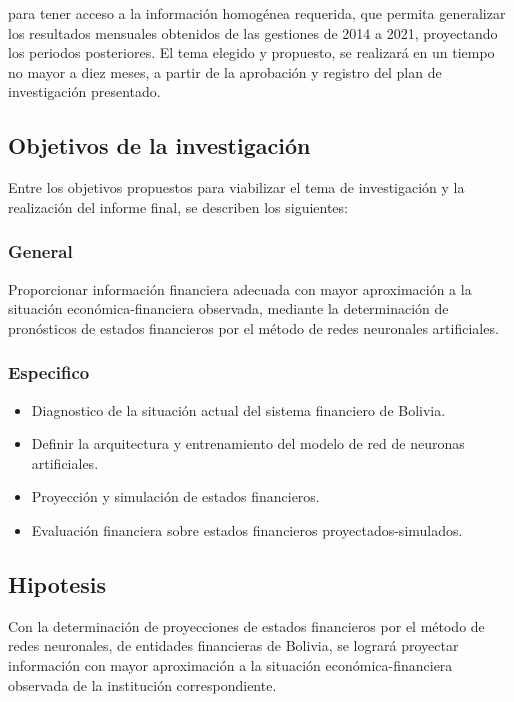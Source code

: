 \documentclass[
  12pt,
]{article}
\providecommand{\tightlist}{%
  \setlength{\itemsep}{0pt}\setlength{\parskip}{0pt}}
\begin{document}
para tener acceso a la información homogénea requerida, que permita
generalizar los resultados mensuales obtenidos de las gestiones de 2014
a 2021, proyectando los periodos posteriores. El tema elegido y
propuesto, se realizará en un tiempo no mayor a diez meses, a partir de
la aprobación y registro del plan de investigación presentado.

\hypertarget{objetivos-de-la-investigaciuxf3n}{%
\subsection{Objetivos de la
investigación}\label{objetivos-de-la-investigaciuxf3n}}

Entre los objetivos propuestos para viabilizar el tema de investigación
y la realización del informe final, se describen los siguientes:

\hypertarget{general}{%
\subsubsection{General}\label{general}}

Proporcionar información financiera adecuada con mayor aproximación a la
situación económica-financiera observada, mediante la determinación de
pronósticos de estados financieros por el método de redes neuronales
artificiales.

\hypertarget{especifico}{%
\subsubsection{Especifico}\label{especifico}}

\begin{itemize}
\tightlist
\item
  Diagnostico de la situación actual del sistema financiero de Bolivia.
\item
  Definir la arquitectura y entrenamiento del modelo de red de neuronas
  artificiales.
\item
  Proyección y simulación de estados financieros.
\item
  Evaluación financiera sobre estados financieros proyectados-simulados.
\end{itemize}

\hypertarget{hipotesis}{%
\subsection{Hipotesis}\label{hipotesis}}

Con la determinación de proyecciones de estados financieros por el
método de redes neuronales, de entidades financieras de Bolivia, se
logrará proyectar información con mayor aproximación a la situación
económica-financiera observada de la institución correspondiente.
\end{document}
